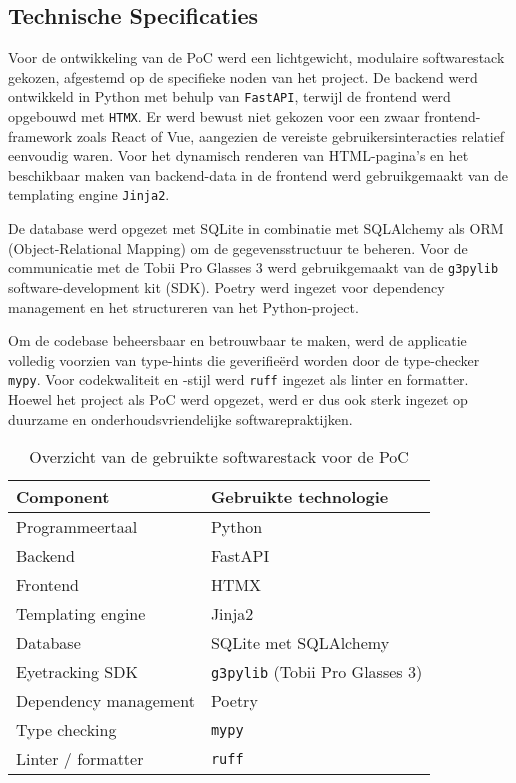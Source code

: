 \subsection{Technische Specificaties}

Voor de ontwikkeling van de PoC werd een lichtgewicht, modulaire softwarestack gekozen, afgestemd op de specifieke noden van het project. 
De backend werd ontwikkeld in Python met behulp van \texttt{FastAPI}, terwijl de frontend werd opgebouwd met \texttt{HTMX}.
Er werd bewust niet gekozen voor een zwaar frontend-framework zoals React of Vue, aangezien de vereiste gebruikersinteracties relatief eenvoudig waren. 
Voor het dynamisch renderen van HTML-pagina’s en het beschikbaar maken van backend-data in de frontend werd gebruikgemaakt van de templating engine \texttt{Jinja2}.

De database werd opgezet met SQLite in combinatie met SQLAlchemy als ORM (Object-Relational Mapping) om de gegevensstructuur te beheren. 
Voor de communicatie met de Tobii Pro Glasses 3 werd gebruikgemaakt van de \texttt{g3pylib} software-development kit (SDK). 
Poetry werd ingezet voor dependency management en het structureren van het Python-project.

Om de codebase beheersbaar en betrouwbaar te maken, werd de applicatie volledig voorzien van type-hints die geverifieërd worden door de type-checker \texttt{mypy}. 
Voor codekwaliteit en -stijl werd \texttt{ruff} ingezet als linter en formatter. 
Hoewel het project als PoC werd opgezet, werd er dus ook sterk ingezet op duurzame en onderhoudsvriendelijke softwarepraktijken.

\begin{table}[H]
\centering
\begin{tabular}{|l|l|}
\hline
\textbf{Component} & \textbf{Gebruikte technologie} \\
\hline
Programmeertaal & Python \\
\hline
Backend & FastAPI \\
\hline
Frontend & HTMX \\
\hline
Templating engine & Jinja2 \\
\hline
Database & SQLite met SQLAlchemy \\
\hline
Eyetracking SDK & \texttt{g3pylib} (Tobii Pro Glasses 3) \\
\hline
Dependency management & Poetry \\
\hline
Type checking & \texttt{mypy} \\
\hline
Linter / formatter & \texttt{ruff} \\
\hline
\end{tabular}
\caption{Overzicht van de gebruikte softwarestack voor de PoC}
\end{table}

